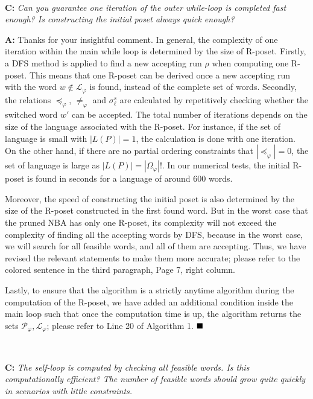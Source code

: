 \documentclass[10pt]{article}
\begin{document}
\hspace*{\fill} \

 \textbf{C:}
\emph{Can you guarantee one iteration of the outer while-loop is completed fast enough? Is
	constructing the initial poset always quick enough? }

\textbf{A:} Thanks for your insightful comment.
In general, the complexity of one iteration within the main while loop
is determined by the size of R-poset.
Firstly, a DFS method is applied to find a
new accepting run $\rho$ when computing one R-poset.
This means that one R-poset can be derived
once a new accepting run with the word
$w\notin\mathcal{L}_\varphi$ is found, instead of the complete set of words.
Secondly, the relations $\preceq_\varphi$, $\neq_\varphi$ and $\sigma^s_\ell$ are calculated by repetitively checking
whether the switched word $w'$ can be accepted.
The total number of iterations depends on the size of the language associated with the R-poset.
For instance,
if the set of language is small with $|L(P)|=1$, the calculation is done with one iteration.
On the other hand, if there are no partial ordering constraints that $|\preceq_\varphi|=0$,
the set of language is large as $|L(P)|=|\Omega_\varphi|!$.
In our numerical tests,
the initial R-poset is found in seconds for a language of around
$600$ words.

Moreover, the speed of constructing the initial poset is also determined by the size of the R-poset constructed in the first found word.
But in the worst case that the pruned NBA has only one R-poset, its complexity will not exceed the complexity of finding
all the accepting words by DFS, because in the worst case, we will
search for all feasible words, and all of them are accepting.
Thus, we have revised the relevant statements to make them more accurate;
please refer to the colored sentence in the third paragraph, Page 7, right column.

Lastly, to ensure that the algorithm is a strictly anytime algorithm during the computation of the R-poset,
we have added an additional condition inside the main loop
such that once the computation time is up, the algorithm returns
the sets $\mathcal{P}_{\varphi},\mathcal{L}_\varphi$; please refer to Line 20 of Algorithm 1.
$\hfill\blacksquare$

\hspace*{\fill} \

\textbf{C:}
\emph{The self-loop is computed by checking all feasible words. Is this computationally efficient?
	The number of feasible words should grow quite quickly in scenarios with little constraints.}
\end{document}
